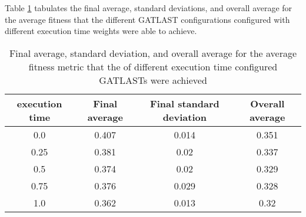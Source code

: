 Table \ref{tab:HP:GA:ExecutionTime:average fitness} tabulates the final average, standard deviations, and overall average for the average fitness that the different GATLAST configurations configured with different execution time weights were able to achieve.
\begin{table}[tbh!]
\centering
\begin{adjustbox}{trim=0cm 0cm 0cm 0cm, clip=true}
\begin{tabular}{|c|c|c|c|}
\hline
execution time & Final average & Final standard deviation & Overall average\\
\hline
0.0 & 0.407 & 0.014 & 0.351\\\hline
0.25 & 0.381 & 0.02 & 0.337\\\hline
0.5 & 0.374 & 0.02 & 0.329\\\hline
0.75 & 0.376 & 0.029 & 0.328\\\hline
1.0 & 0.362 & 0.013 & 0.32\\\hline
\end{tabular}
\end{adjustbox}
\caption{Final average, standard deviation, and overall average for the average fitness metric that the of different execution time configured GATLASTs were achieved}
\label{tab:HP:GA:ExecutionTime:average fitness}
\end{table}